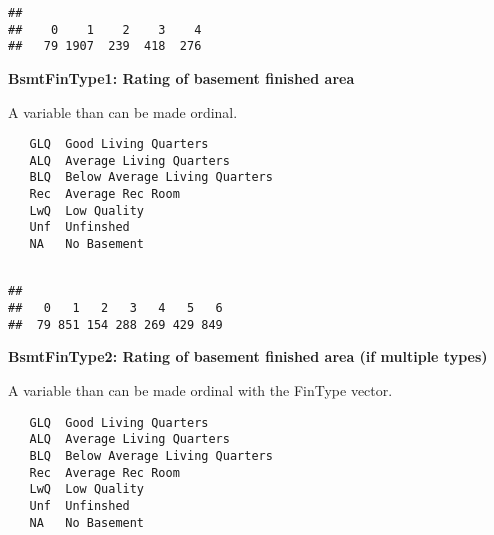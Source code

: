 \documentclass[]{article}
\newenvironment{Shaded}{\begin{snugshade}}{\end{snugshade}}
\newcommand{\DecValTok}[1]{\textcolor[rgb]{0.00,0.00,0.81}{#1}}
\newcommand{\KeywordTok}[1]{\textcolor[rgb]{0.13,0.29,0.53}{\textbf{#1}}}
\newcommand{\NormalTok}[1]{#1}
\newcommand{\OperatorTok}[1]{\textcolor[rgb]{0.81,0.36,0.00}{\textbf{#1}}}
\newcommand{\StringTok}[1]{\textcolor[rgb]{0.31,0.60,0.02}{#1}}
\begin{document}
\begin{verbatim}
## 
##    0    1    2    3    4 
##   79 1907  239  418  276
\end{verbatim}

\textbf{BsmtFinType1: Rating of basement finished area}

A variable than can be made ordinal.

\begin{verbatim}
   GLQ  Good Living Quarters
   ALQ  Average Living Quarters
   BLQ  Below Average Living Quarters   
   Rec  Average Rec Room
   LwQ  Low Quality
   Unf  Unfinshed
   NA   No Basement
    
\end{verbatim}

\begin{Shaded}
\end{Shaded}

\begin{verbatim}
## 
##   0   1   2   3   4   5   6 
##  79 851 154 288 269 429 849
\end{verbatim}

\textbf{BsmtFinType2: Rating of basement finished area (if multiple
types)}

A variable than can be made ordinal with the FinType vector.

\begin{verbatim}
   GLQ  Good Living Quarters
   ALQ  Average Living Quarters
   BLQ  Below Average Living Quarters   
   Rec  Average Rec Room
   LwQ  Low Quality
   Unf  Unfinshed
   NA   No Basement
\end{verbatim}
\end{document}
